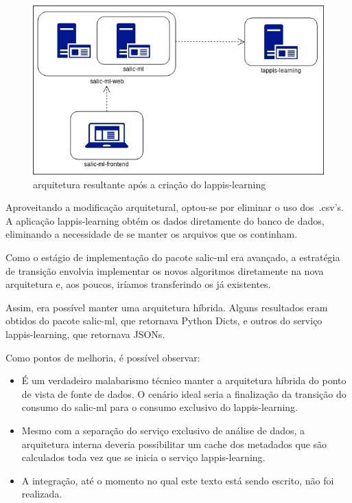\begin{figure}
\centering
\includegraphics{figs/salicml4.jpg}
\caption{arquitetura resultante após a criação do lappis-learning}
\end{figure}

Aproveitando a modificação arquitetural, optou-se por eliminar o uso
dos~.csv's. A aplicação lappis-learning obtém os dados diretamente do
banco de dados, eliminando a necessidade de se manter os arquivos que os
continham.

Como o estágio de implementação do pacote salic-ml era avançado, a
estratégia de transição envolvia implementar os novos algoritmos
diretamente na nova arquitetura e, aos poucos, iríamos transferindo os
já existentes.

Assim, era possível manter uma arquitetura híbrida. Alguns resultados
eram obtidos do pacote salic-ml, que retornava Python Dicts, e outros do
serviço lappis-learning, que retornava JSONs.

Como pontos de melhoria, é possível observar:

\begin{itemize}
\tightlist
\item
  É um verdadeiro malabarismo técnico manter a arquitetura híbrida do
  ponto de vista de fonte de dados. O cenário ideal seria a finalização
  da transição do consumo do salic-ml para o consumo exclusivo do
  lappis-learning.
\item
  Mesmo com a separação do serviço exclusivo de análise de dados, a
  arquitetura interna deveria possibilitar um cache dos metadados que
  são calculados toda vez que se inicia o serviço lappis-learning.
\item
  A integração, até o momento no qual este texto está sendo escrito, não
  foi realizada.
\end{itemize}

